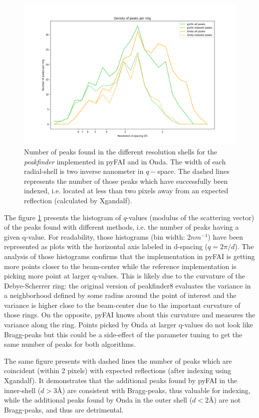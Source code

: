 \documentclass[preprint]{iucr}              %
\begin{document}
\begin{figure}
\label{peak_per_ring}
\includegraphics[width=12cm]{peak_per_ring}
\caption{Number of peaks found in the different resolution shells for the \textit{peakfinder} implemented in pyFAI and in Onda. 
The width of each radial-shell is two inverse nanometer in $q-$space. 
The dashed lines represents the number of those peaks which have successfully been indexed, i.e. located at less than two pixels away from an expected reflection (calculated by Xgandalf). }
\end{figure}

The figure \ref{peak_per_ring} presents the histogram of $q$-values (modulus of the scattering vector) of the peaks found with different methods, i.e. the number of peaks having a given q-value.
For readability, those histograms (bin width: $2 nm^{-1}$) have been represented as plots with the horizontal axis labeled in d-spacing ($q=2\pi/d$).  
The analysis of those histograms confirms that the implementation in pyFAI is getting more points closer to the beam-center while the reference implementation is picking more point at larger q-values.
This is likely due to the curvature of the Debye-Scherrer ring: the original version of peakfinder8 evaluates the variance in a neighborhood defined by some radius around the point of interest and the variance is higher close to the beam-center due to the important curvature of those rings.
On the opposite, pyFAI knows about this curvature and measures the variance along the ring.
Points picked by Onda at larger q-values do not look like Bragg-peaks but this could be a side-effect of the parameter tuning to get the same number of peaks for both algorithms.

The same figure presents with dashed lines the number of peaks which are coincident (within 2 pixels) with expected reflections (after indexing using Xgandalf).
It demonstrates that the additional peaks found by pyFAI in the inner-shell ($d>3$\AA{}) are consistent with Bragg-peaks, thus valuable for indexing, while the additional peaks found by Onda in the outer shell ($d<2$\AA) are not Bragg-peaks, and thus are detrimental.
\end{document}
